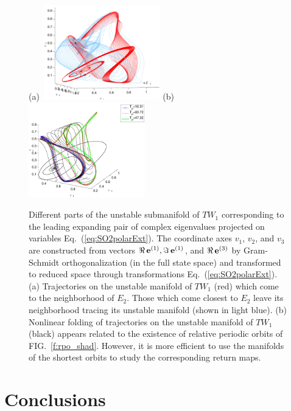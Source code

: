\documentclass[aip,cha,showpacs,reprint]{revtex4-1} %
\newcommand{\refeq}  [1] {Eq.~(\ref{#1})}                   %
\newcommand{\reffig} [1] {FIG.~\ref{#1}}                    %
\newcommand{\jEigvec}[1][]{\ensuremath{{\bf e}^{(#1)}}} %
\newcommand{\rpo}{rela\-ti\-ve periodic orbit}
\newcommand{\EQV}[1]{\ensuremath{E_{#1}}}
\newcommand{\REQV}[2]{\ensuremath{TW_{#1#2}}} %
\begin{document}
\begin{figure}[ht]
 \begin{center}
  (a)~\includegraphics[width=0.45\textwidth]{ks22_TW1_E2_manif_inv}
  (b)~\includegraphics[width=0.45\textwidth]{ks22_TW1_manif_rpos_inv}
 \end{center}
  \caption{Different parts of the unstable submanifold of \REQV{}{1} corresponding to the leading expanding pair of complex eigenvalues
projected on variables \refeq{eq:SO2polarExt}. The coordinate axes $v_1$,
$v_2$, and $v_3$ are constructed from vectors $\Re\, \jEigvec[1], \Im\, \jEigvec[1]$, and ${\Re\,} \jEigvec[3]$
by Gram-Schmidt orthogonalization (in the full state space) and transformed to reduced space through transformations
\refeq{eq:SO2polarExt}. (a) Trajectories on the unstable manifold of \REQV{}{1} (red) which come to the neighborhood of $\EQV{2}$.
Those which come closest to $\EQV{2}$ leave its neighborhood tracing its unstable manifold (shown in light blue).
(b) Nonlinear folding of trajectories on the unstable manifold of \REQV{}{1} (black) appears related to the existence of
\rpo s of \reffig{f:rpo_shad}. However, it is more efficient to use the manifolds of the shortest orbits to study the corresponding
return maps.
  }
\label{f:ks22_TW1_manifold}
\end{figure}


\section{Conclusions}
\end{document}
